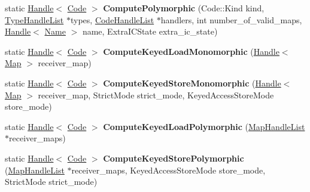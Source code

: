 \begin{DoxyCompactItemize}
\item 
\hypertarget{classv8_1_1internal_1_1_property_i_c_compiler_a66dfcf82bdf5a2961a83408cf05db5aa}{}static \hyperlink{classv8_1_1internal_1_1_handle}{Handle}$<$ \hyperlink{classv8_1_1internal_1_1_code}{Code} $>$ {\bfseries Compute\+Polymorphic} (Code\+::\+Kind kind, \hyperlink{classv8_1_1internal_1_1_list}{Type\+Handle\+List} $\ast$types, \hyperlink{classv8_1_1internal_1_1_list}{Code\+Handle\+List} $\ast$handlers, int number\+\_\+of\+\_\+valid\+\_\+maps, \hyperlink{classv8_1_1internal_1_1_handle}{Handle}$<$ \hyperlink{classv8_1_1internal_1_1_name}{Name} $>$ name, Extra\+I\+C\+State extra\+\_\+ic\+\_\+state)\label{classv8_1_1internal_1_1_property_i_c_compiler_a66dfcf82bdf5a2961a83408cf05db5aa}

\item 
\hypertarget{classv8_1_1internal_1_1_property_i_c_compiler_a027d27a4d3695b080328ca1b5b006f49}{}static \hyperlink{classv8_1_1internal_1_1_handle}{Handle}$<$ \hyperlink{classv8_1_1internal_1_1_code}{Code} $>$ {\bfseries Compute\+Keyed\+Load\+Monomorphic} (\hyperlink{classv8_1_1internal_1_1_handle}{Handle}$<$ \hyperlink{classv8_1_1internal_1_1_map}{Map} $>$ receiver\+\_\+map)\label{classv8_1_1internal_1_1_property_i_c_compiler_a027d27a4d3695b080328ca1b5b006f49}

\item 
\hypertarget{classv8_1_1internal_1_1_property_i_c_compiler_ae27ca4d86134c5ba8fc9daf2095bd162}{}static \hyperlink{classv8_1_1internal_1_1_handle}{Handle}$<$ \hyperlink{classv8_1_1internal_1_1_code}{Code} $>$ {\bfseries Compute\+Keyed\+Store\+Monomorphic} (\hyperlink{classv8_1_1internal_1_1_handle}{Handle}$<$ \hyperlink{classv8_1_1internal_1_1_map}{Map} $>$ receiver\+\_\+map, Strict\+Mode strict\+\_\+mode, Keyed\+Access\+Store\+Mode store\+\_\+mode)\label{classv8_1_1internal_1_1_property_i_c_compiler_ae27ca4d86134c5ba8fc9daf2095bd162}

\item 
\hypertarget{classv8_1_1internal_1_1_property_i_c_compiler_ad2d05fbcb366560e7a931b2ee74c1a1d}{}static \hyperlink{classv8_1_1internal_1_1_handle}{Handle}$<$ \hyperlink{classv8_1_1internal_1_1_code}{Code} $>$ {\bfseries Compute\+Keyed\+Load\+Polymorphic} (\hyperlink{classv8_1_1internal_1_1_list}{Map\+Handle\+List} $\ast$receiver\+\_\+maps)\label{classv8_1_1internal_1_1_property_i_c_compiler_ad2d05fbcb366560e7a931b2ee74c1a1d}

\item 
\hypertarget{classv8_1_1internal_1_1_property_i_c_compiler_aa429d906447b3b91122be9b0706ebf4c}{}static \hyperlink{classv8_1_1internal_1_1_handle}{Handle}$<$ \hyperlink{classv8_1_1internal_1_1_code}{Code} $>$ {\bfseries Compute\+Keyed\+Store\+Polymorphic} (\hyperlink{classv8_1_1internal_1_1_list}{Map\+Handle\+List} $\ast$receiver\+\_\+maps, Keyed\+Access\+Store\+Mode store\+\_\+mode, Strict\+Mode strict\+\_\+mode)\label{classv8_1_1internal_1_1_property_i_c_compiler_aa429d906447b3b91122be9b0706ebf4c}


\end{DoxyCompactItemize}
